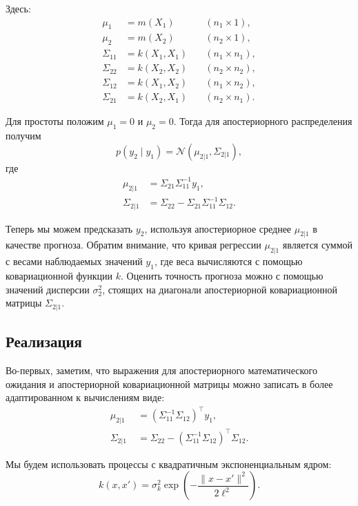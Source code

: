 \documentclass[11pt,a4paper]{article}
\begin{document}
Здесь: \[
\begin{aligned}
    \mu_{1}     &= m(X_1)     \quad & (n_1 \times 1),   \\
    \mu_{2}     &= m(X_2)     \quad & (n_2 \times 1),   \\
    \Sigma_{11} &= k(X_1,X_1) \quad & (n_1 \times n_1), \\
    \Sigma_{22} &= k(X_2,X_2) \quad & (n_2 \times n_2), \\
    \Sigma_{12} &= k(X_1,X_2) \quad & (n_1 \times n_2), \\
    \Sigma_{21} &= k(X_2,X_1) \quad & (n_2 \times n_1).
\end{aligned}
\]

    Для простоты положим \(\mu_{1} = 0\) и \(\mu_{2} = 0\). Тогда для
апостериорного распределения получим \[
  p(y_2 \mid y_1) = \mathcal{N}(\mu_{2|1}, \Sigma_{2|1}),
\]
где \[
\begin{split}
    \mu_{2|1}    &= \Sigma_{21} \Sigma_{11}^{-1} y_1, \\
    \Sigma_{2|1} &= \Sigma_{22} - \Sigma_{21} \Sigma_{11}^{-1}\Sigma_{12}.
\end{split}
\]

Теперь мы можем предсказать \(y_2\), используя апостериорное среднее
\(\mu_{2|1}\) в качестве прогноза. Обратим внимание, что кривая
регрессии \(\mu_{2|1}\) является суммой с весами наблюдаемых значений
\(y_1\), где веса вычисляются с помощью ковариационной функции \(k\).
Оценить точность прогноза можно с помощью значений дисперсии
\(\sigma_2^2\), стоящих на диагонали апостериорной ковариационной
матрицы \(\Sigma_{2|1}\).

    \hypertarget{ux440ux435ux430ux43bux438ux437ux430ux446ux438ux44f}{%
\subsection{Реализация}\label{ux440ux435ux430ux43bux438ux437ux430ux446ux438ux44f}}

Во-первых, заметим, что выражения для апостериорного математического
ожидания и апостериорной ковариационной матрицы можно записать в более
адаптированном к вычислениям виде: \[
\begin{split}
    \mu_{2|1}    &\;= (\Sigma_{11}^{-1}\Sigma_{12})^\top  y_1, \\
    \Sigma_{2|1} &\;= \Sigma_{22} - (\Sigma_{11}^{-1}\Sigma_{12})^\top  \Sigma_{12}.
\end{split}
\]

    Мы будем использовать процессы с квадратичным экспоненциальным ядром: \[
  k(x, x') = \sigma_k^2 \exp{ \left( -\frac{\lVert x - x' \rVert^2}{2\ell^2}  \right) }.
\]
\end{document}
